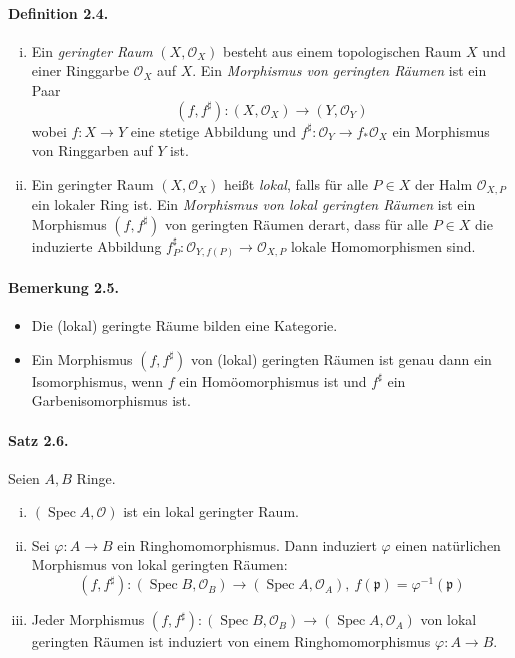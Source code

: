 \documentclass[11pt,b5paper,openany]{memoir}
\begin{document}
\paragraph{Definition 2.4.}\label{2.4} \begin{enumerate}[(i)]
\item Ein \textit{geringter Raum} $(X,\mathcal{O}_X)$ besteht aus einem topologischen Raum $X$ und einer Ringgarbe $\mathcal{O}_X$ auf $X$. Ein \textit{Morphismus von geringten Räumen} ist ein Paar
\[(f,f^\sharp):(X,\mathcal{O}_X)\to (Y,\mathcal{O}_Y) \]
wobei $f:X\to Y$ eine stetige Abbildung und $f^\sharp:\mathcal{O}_Y\to f_\ast\mathcal{O}_X$ ein Morphismus von Ringgarben auf $Y$ ist.
\item Ein geringter Raum $(X,\mathcal{O}_X)$ heißt \textit{lokal}, falls für alle $P\in X$ der Halm $\mathcal{O}_{X,P}$ ein lokaler Ring ist. Ein \textit{Morphismus von lokal geringten Räumen} ist ein Morphismus $(f,f^\sharp)$ von geringten Räumen derart, dass für alle $P\in X$ die induzierte Abbildung $f_P^\sharp:\mathcal{O}_{Y,f(P)}\to\mathcal{O}_{X,P}$ lokale Homomorphismen sind.
\end{enumerate}

\paragraph{Bemerkung 2.5.}\label{2.5}\begin{itemize}
\item Die (lokal) geringte Räume bilden eine Kategorie.
\item Ein Morphismus $(f,f^\sharp)$ von (lokal) geringten Räumen ist genau dann ein Isomorphismus, wenn $f$ ein Homöomorphismus ist und $f^\sharp$ ein Garbenisomorphismus ist.
\end{itemize}

\paragraph{Satz 2.6.}\label{2.6} Seien $A,B$ Ringe.
\begin{enumerate}[(i)]
\item $(\operatorname{Spec}A,\mathcal{O})$ ist ein lokal geringter Raum.
\item Sei $\varphi:A\to B$ ein Ringhomomorphismus. Dann induziert $\varphi$ einen natürlichen Morphismus von lokal geringten Räumen:
\[(f,f^\sharp):(\operatorname{Spec}B,\mathcal{O}_B)\to (\operatorname{Spec}A,\mathcal{O}_A),\ f(\mathfrak{p})=\varphi^{-1}(\mathfrak{p}) \]
\item Jeder Morphismus $(f,f^\sharp):(\operatorname{Spec}B,\mathcal{O}_B)\to(\operatorname{Spec}A,\mathcal{O}_A)$ von lokal geringten Räu\-men ist induziert von einem Ringhomomorphismus $\varphi:A\to B$.
\end{enumerate}
\end{document}
